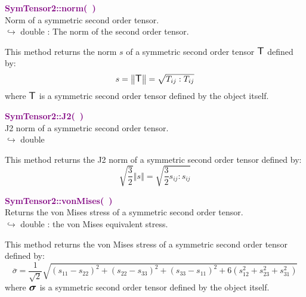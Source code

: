 \textcolor{purple}{\textbf{SymTensor2::norm(~)}}\label{SymTensor2::norm()}\\
Norm of a symmetric second order tensor.\\ \hspace*{10mm}$\hookrightarrow$ double : The norm of the second order tensor.

This method returns the norm $s$ of a symmetric second order tensor $\mbox{\large\ensuremath{\mathsf{T}}}$ defined by:\begin{equation*}
s = \left\Vert \mbox{\large\ensuremath{\mathsf{T}}} \right\Vert  = \sqrt {T_{ij}:T_{ij}}
\end{equation*}
where $\mbox{\large\ensuremath{\mathsf{T}}}$ is a symmetric second order tensor defined by the object itself.

\textcolor{purple}{\textbf{SymTensor2::J2(~)}}\label{SymTensor2::J2()}\\
J2 norm of a symmetric second order tensor.\\ \hspace*{10mm}$\hookrightarrow$ double

This method returns the J2 norm of a symmetric second order tensor defined by:
\begin{equation*}
\sqrt {\frac{3}{2}} \left\Vert s \right\Vert  = \sqrt {\frac{3}{2} s_{ij}:s_{ij}}
\end{equation*}

\textcolor{purple}{\textbf{SymTensor2::vonMises(~)}}\label{SymTensor2::vonMises()}\\
Returns the von Mises stress of a symmetric second order tensor.\\ \hspace*{10mm}$\hookrightarrow$ double : the von Mises equivalent stress.

This method returns the von Mises stress of a symmetric second order tensor defined by:
\begin{equation*}
\overline{\sigma} = \frac {1}{\sqrt{2}}\sqrt{(s_{11}-s_{22})^2+(s_{22}-s_{33})^2+(s_{33}-s_{11})^2+6(s_{12}^2+s_{23}^2+s_{31}^2)}
\end{equation*}
where $\mbox{\large\ensuremath{\boldsymbol{\sigma}}}$ is a symmetric second order tensor defined by the object itself.

